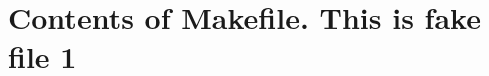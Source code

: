 \documentclass{article}
\begin{document}
\section*{Contents of Makefile. This is fake file 1}

\end{document}
